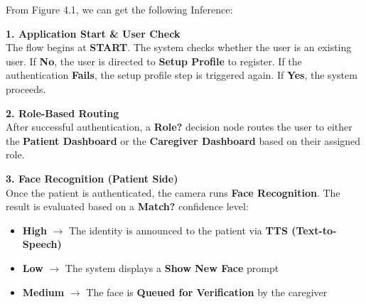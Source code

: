\newpage
\begin{flushleft}
From Figure 4.1, we can get the following Inference:

\textbf{1. Application Start \& User Check} \\
The flow begins at \textbf{START}. The system checks whether the user is an existing user. If \textbf{No}, the user is directed to \textbf{Setup Profile} to register. If the authentication \textbf{Fails}, the setup profile step is triggered again. If \textbf{Yes}, the system proceeds.

\textbf{2. Role-Based Routing} \\
After successful authentication, a \textbf{Role?} decision node routes the user to either the \textbf{Patient Dashboard} or the \textbf{Caregiver Dashboard} based on their assigned role.

\textbf{3. Face Recognition (Patient Side)} \\
Once the patient is authenticated, the camera runs \textbf{Face Recognition}. The result is evaluated based on a \textbf{Match?} confidence level:
\begin{itemize}
    \item \textbf{High} $\rightarrow$ The identity is announced to the patient via \textbf{TTS (Text-to-Speech)}
    \item \textbf{Low} $\rightarrow$ The system displays a \textbf{Show New Face} prompt
    \item \textbf{Medium} $\rightarrow$ The face is \textbf{Queued for Verification} by the caregiver
\end{itemize}


\end{flushleft}

